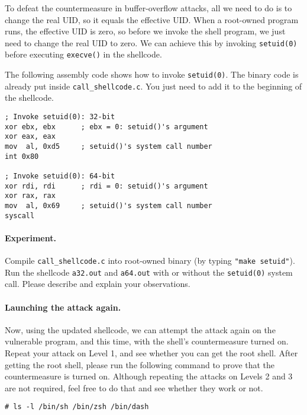 To defeat the countermeasure in buffer-overflow attacks,
all we need to do is to change the real UID, so it equals the 
effective UID. When a root-owned \setuid program runs, the 
effective UID is zero, so before we invoke the shell program,
we just need to change the real UID to zero.
We can achieve this by invoking \texttt{setuid(0)} before executing 
\texttt{execve()} in the shellcode. 

The following assembly code shows how to invoke
\texttt{setuid(0)}. The binary code is already put inside 
\texttt{call\_shellcode.c}. You just need to add it to the 
beginning of the shellcode. 

\begin{lstlisting}[language={[x86masm]Assembler}]
; Invoke setuid(0): 32-bit
xor ebx, ebx      ; ebx = 0: setuid()'s argument
xor eax, eax
mov  al, 0xd5     ; setuid()'s system call number
int 0x80

; Invoke setuid(0): 64-bit
xor rdi, rdi      ; rdi = 0: setuid()'s argument
xor rax, rax       
mov  al, 0x69     ; setuid()'s system call number
syscall
\end{lstlisting}


\paragraph{Experiment.} Compile \texttt{call\_shellcode.c} into
root-owned binary (by typing \texttt{"make setuid"}). 
Run the shellcode \texttt{a32.out} and \texttt{a64.out} with or without 
the \texttt{setuid(0)} system call. Please describe and explain
your observations. 

\paragraph{Launching the attack again.}
Now, using the updated shellcode, we can attempt the attack 
again on the vulnerable program, and this time, with the 
shell's countermeasure turned on. Repeat your attack
on Level 1, and see whether 
you can get the root shell. After getting the root shell,
please run the following command to prove that the countermeasure
is turned on. Although repeating the attacks on Levels 2 and 3 
are not required, feel free to do that and see whether they work or not.

\begin{lstlisting}
# ls -l /bin/sh /bin/zsh /bin/dash
\end{lstlisting}
 


